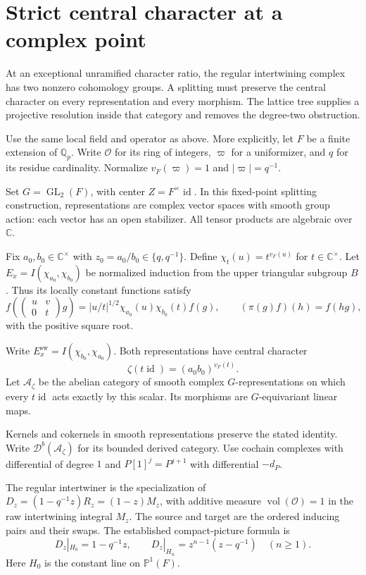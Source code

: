 \section{Strict central character at a complex point}

At an exceptional unramified character ratio, the regular intertwining complex has two nonzero cohomology groups.
A splitting must preserve the central character on every representation and every morphism.
The lattice tree supplies a projective resolution inside that category and removes the degree-two obstruction.

Use the same local field and operator as above. More explicitly, let $F$ be a finite extension of $\mathbb Q_p$.
Write $\mathcal O$ for its ring of integers, $\varpi$ for a uniformizer,
and $q$ for its residue cardinality.
Normalize $v_F(\varpi)=1$ and $|\varpi|=q^{-1}$.

Set $G=\operatorname{GL}_2(F)$, with center $Z=F^\times\operatorname{id}$.
In this fixed-point splitting construction, representations are complex vector spaces with smooth group action:
each vector has an open stabilizer.
All tensor products are algebraic over $\mathbb C$.

Fix $a_0,b_0\in\mathbb C^\times$ with $z_0=a_0/b_0\in\{q,q^{-1}\}$.
Define $\chi_t(u)=t^{v_F(u)}$ for $t\in\mathbb C^\times$.
Let $E_x=I(\chi_{a_0},\chi_{b_0})$ be normalized induction from the upper triangular subgroup $B$.
Thus its locally constant functions satisfy
\[
 f\left(\begin{pmatrix}u&v\\0&t\end{pmatrix}g\right)
   =|u/t|^{1/2}\chi_{a_0}(u)\chi_{b_0}(t)f(g),
 \qquad (\pi(g)f)(h)=f(hg),
\]
with the positive square root.

Write $E_x^{\mathrm{sw}}=I(\chi_{b_0},\chi_{a_0})$.
Both representations have central character
\[
 \zeta(t\operatorname{id})=(a_0b_0)^{v_F(t)}.
\]
Let $\mathcal A_\zeta$ be the abelian category of smooth complex $G$-representations
on which every $t\operatorname{id}$ acts exactly by this scalar.
Its morphisms are $G$-equivariant linear maps.

Kernels and cokernels in smooth representations preserve the stated identity.
Write $\mathcal D^b(\mathcal A_\zeta)$ for its bounded derived category.
Use cochain complexes with differential of degree $1$ and
$P[1]^j=P^{j+1}$ with differential $-d_P$.

The regular intertwiner is the specialization of
$D_z=(1-q^{-1}z)R_z=(1-z)M_z$, with additive measure
$\operatorname{vol}(\mathcal O)=1$ in the raw intertwining integral $M_z$.
The source and target are the ordered inducing pairs and their swaps.
The established compact-picture formula is
\[
 D_z|_{H_0}=1-q^{-1}z,\qquad
 D_z|_{H_n}=z^{n-1}(z-q^{-1})\quad(n\ge1).
\]
Here $H_0$ is the constant line on $\mathbb P^1(F)$.

